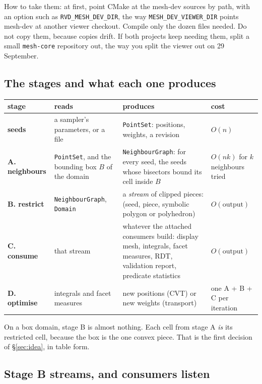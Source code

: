 \documentclass[11pt,a4paper]{article}
\newcommand{\code}[1]{\texttt{#1}}          %
\newcommand{\secref}[1]{\S\ref{#1}}
\begin{document}
How to take them: at first, point CMake at the mesh-dev sources by path, with an option such as
\code{RVD\_MESH\_DEV\_DIR}, the way \code{MESH\_DEV\_VIEWER\_DIR} points mesh-dev at another
viewer checkout. Compile only the dozen files needed. Do not copy them, because copies drift. If
both projects keep needing them, split a small \code{mesh-core} repository out, the way you
split the viewer out on 29 September.

\subsection{The stages and what each one produces}\label{ssec:stages}

{\small
\begin{xltabular}{\linewidth}{@{}P{2.2cm} L L P{2.1cm}@{}}
\toprule
stage & reads & produces & cost \\
\midrule
\endhead
\textbf{seeds}
  & a sampler's parameters, or a file
  & \code{PointSet}: positions, weights, a revision
  & $O(n)$ \\
\textbf{A. neighbours}
  & \code{PointSet}, and the bounding box $B$ of the domain
  & \code{NeighbourGraph}: for every seed, the seeds whose bisectors bound its cell inside $B$
  & $O(nk)$ for $k$ neighbours tried \\
\textbf{B. restrict}
  & \code{NeighbourGraph}, \code{Domain}
  & a \emph{stream} of clipped pieces: (seed, piece, symbolic polygon or polyhedron)
  & $O(\text{output})$ \\
\textbf{C. consume}
  & that stream
  & whatever the attached consumers build: display mesh, integrals, facet measures, RDT,
    validation report, predicate statistics
  & $O(\text{output})$ \\
\textbf{D. optimise}
  & integrals and facet measures
  & new positions (CVT) or new weights (transport)
  & one A + B + C per iteration \\
\bottomrule
\end{xltabular}}

On a box domain, stage B is almost nothing. Each cell from stage A \emph{is} its restricted
cell, because the box is the one convex piece. That is the first decision of \secref{sec:idea},
in table form.

\subsection{Stage B streams, and consumers listen}\label{ssec:streams}
\end{document}
